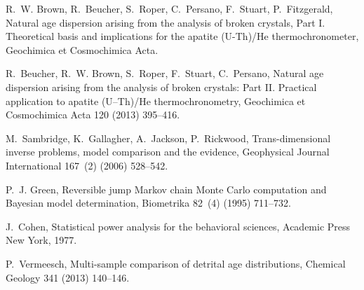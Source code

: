 \documentclass{article}
\begin{document}
\begin{thebibliography}{26}
R.~W. Brown, R.~Beucher, S.~Roper, C.~Persano, F.~Stuart, P.~Fitzgerald,
  {Natural age dispersion arising from the analysis of broken crystals, Part I.
  Theoretical basis and implications for the apatite (U-Th)/He
  thermochronometer}, Geochimica et Cosmochimica Acta.

R.~Beucher, R.~W. Brown, S.~Roper, F.~Stuart, C.~Persano, {Natural age
  dispersion arising from the analysis of broken crystals: Part II. Practical
  application to apatite (U--Th)/He thermochronometry}, Geochimica et
  Cosmochimica Acta 120 (2013) 395--416.

M.~Sambridge, K.~Gallagher, A.~Jackson, P.~Rickwood, {Trans-dimensional inverse
  problems, model comparison and the evidence}, Geophysical Journal
  International 167~(2) (2006) 528--542.

P.~J. Green, {Reversible jump Markov chain Monte Carlo computation and Bayesian
  model determination}, Biometrika 82~(4) (1995) 711--732.

J.~Cohen, {Statistical power analysis for the behavioral sciences}, Academic
  Press New York, 1977.

P.~Vermeesch, Multi-sample comparison of detrital age distributions, Chemical
  Geology 341 (2013) 140--146.

\end{thebibliography}


%
%
\end{document}
